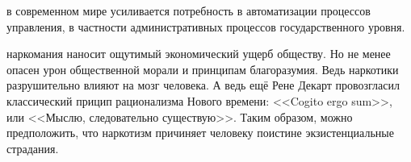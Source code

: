 в современном мире усиливается потребность в автоматизации процессов управления,
в частности административных процессов государственного уровня.

наркомания наносит ощутимый экономический ущерб обществу. Но не менее опасен
урон общественной морали и принципам благоразумия. Ведь наркотики разрушительно
влияют на мозг человека. А ведь ещё Рене Декарт провозгласил классический прицип
рационализма Нового времени: <<Cogito ergo sum>>, или <<Мыслю, следовательно
существую>>. Таким образом, можно предположить, что наркотизм причиняет человеку
поистине экзистенциальные страдания.
